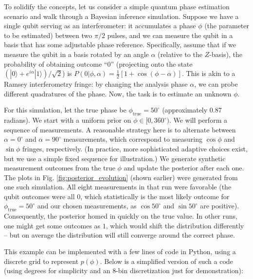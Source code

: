 To solidify the concepts, let us consider a simple quantum phase
estimation scenario and walk through a Bayesian inference
simulation. Suppose we have a single qubit serving as an
interferometer: it accumulates a phase $\phi$ (the parameter to be
estimated) between two $\pi/2$ pulses, and we can measure the qubit in
a basis that has some adjustable phase reference. Specifically, assume
that if we measure the qubit in a basis rotated by an angle $\alpha$
(relative to the $Z$-basis), the probability of obtaining outcome
“$0$” (projecting onto the state $(|0\rangle +
e^{i\alpha}|1\rangle)/\sqrt{2}$) is $P(0|\phi,\alpha) = \frac{1}{2}[1
  + \cos(\phi - \alpha)]$. This is akin to a Ramsey interferometry
fringe: by changing the analysis phase $\alpha$, we can probe
different quadratures of the phase. Now, the task is to estimate an
unknown $\phi$.



For this simulation, let the true phase be $\phi_{\text{true}} =
50^\circ$ (approximately $0.87$ radians). We start with a uniform
prior on $\phi \in [0,360^\circ)$. We will perform a sequence of
  measurements. A reasonable strategy here is to alternate between
  $\alpha=0^\circ$ and $\alpha=90^\circ$ measurements, which
  correspond to measuring $\cos\phi$ and $\sin\phi$ fringes,
  respectively. (In practice, more sophisticated adaptive choices
  exist, but we use a simple fixed sequence for illustration.) We
  generate synthetic measurement outcomes from the true $\phi$ and
  update the posterior after each one. The plots in
  Fig. \ref{fig:posterior_evolution} (shown earlier) were generated
  from one such simulation. All eight measurements in that run were
  favorable (the qubit outcomes were all $0$, which statistically is
  the most likely outcome for $\phi_{\text{true}}=50^\circ$ and our
  chosen measurements, as $\cos 50^\circ$ and $\sin 50^\circ$ are
  positive). Consequently, the posterior homed in quickly on the true
  value. In other runs, one might get some outcomes as $1$, which
  would shift the distribution differently – but on average the
  distribution will still converge around the correct phase.



This example can be implemented with a few lines of code in Python,
using a discrete grid to represent $p(\phi)$. Below is a simplified
version of such a code (using degrees for simplicity and an 8-bin
discretization just for demonstration):



